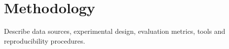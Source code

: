\chapter{Methodology}\label{chap:methodology}
Describe data sources, experimental design, evaluation metrics, tools and reproducibility procedures.
